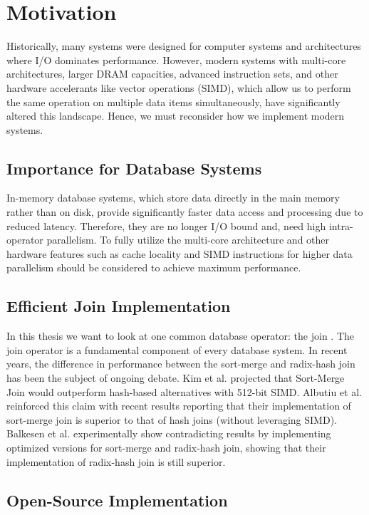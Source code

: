 \section{Motivation}
\label{sec:motivation}

Historically, many systems were designed for computer systems and architectures where I/O dominates
performance. However, modern systems with multi-core architectures, larger DRAM capacities,
advanced instruction sets, and other hardware accelerants like vector operations (SIMD), which allow us to
perform the same operation on multiple data items simultaneously, have significantly altered this
landscape. Hence, we must reconsider how we implement modern systems.

\subsection{Importance for Database Systems}
In-memory database systems, which store data directly in the main memory rather than on disk,
provide significantly faster data access and processing due to reduced latency.
Therefore, they are no longer I/O bound and, need high intra-operator
parallelism. To fully utilize the multi-core architecture and other hardware features such as cache
locality and SIMD instructions for higher data parallelism should be considered to achieve maximum
performance.

\subsection{Efficient Join Implementation}
In this thesis we want to look at one common database operator: the join \cite{DBLP:conf/cloud/BlanasP13}.
The join operator is a fundamental component of every database system.
In recent years, the difference in performance between the sort-merge and radix-hash join has been
the subject of ongoing debate. Kim et al. \cite{10.14778/1687553.1687564} projected that Sort-Merge Join would outperform hash-based
alternatives with 512-bit SIMD. Albutiu et al. \cite{MPSM} reinforced this claim with recent results reporting that
their implementation of sort-merge join is superior to that of hash joins (without
leveraging SIMD). Balkesen et al. \cite{Balkesen} experimentally show contradicting results by implementing 
optimized versions for sort-merge and radix-hash join, showing that their implementation of
radix-hash join is still superior.

\subsection{Open-Source Implementation}

